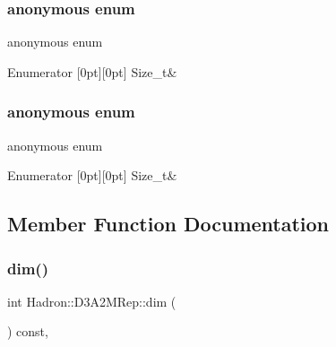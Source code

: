 \subsubsection{\texorpdfstring{anonymous enum}{anonymous enum}}
{\footnotesize\ttfamily anonymous enum}

\begin{DoxyEnumFields}{Enumerator}
[0pt][0pt]{}\mbox{\label{structHadron_1_1D3A2MRep_a0fe2ae6039558d4c5179d21c245bc7e9a164d3e97df3559ada68314d124d6bd97}} 
Size\+\_\+t&\\
\hline

\end{DoxyEnumFields}
\mbox{\label{structHadron_1_1D3A2MRep_a0fe2ae6039558d4c5179d21c245bc7e9}} 
\subsubsection{\texorpdfstring{anonymous enum}{anonymous enum}}
{\footnotesize\ttfamily anonymous enum}

\begin{DoxyEnumFields}{Enumerator}
[0pt][0pt]{}\mbox{\label{structHadron_1_1D3A2MRep_a0fe2ae6039558d4c5179d21c245bc7e9a164d3e97df3559ada68314d124d6bd97}} 
Size\+\_\+t&\\
\hline

\end{DoxyEnumFields}


\subsection{Member Function Documentation}
\mbox{\label{structHadron_1_1D3A2MRep_ae911a1abb0e401263bce94ba89ac6142}} 
\subsubsection{\texorpdfstring{dim()}{dim()}\hspace{0.1cm}{\footnotesize\ttfamily [1/2]}}
{\footnotesize\ttfamily int Hadron\+::\+D3\+A2\+M\+Rep\+::dim (\begin{DoxyParamCaption}{ }\end{DoxyParamCaption}) const\hspace{0.3cm}{\ttfamily [inline]}, {\ttfamily [virtual]}}

